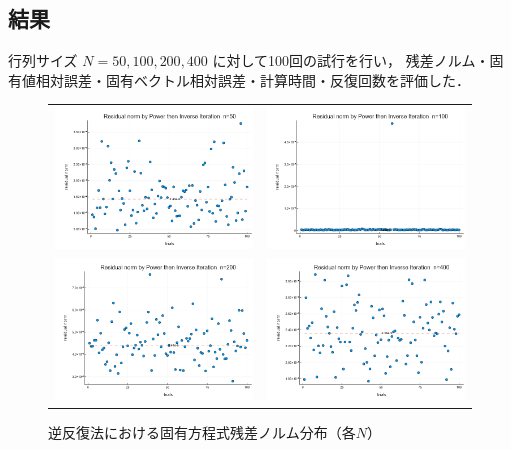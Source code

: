 \documentclass[a4paper,11pt]{ltjsarticle}
\begin{document}
\subsection{結果}
行列サイズ $N=50, 100, 200, 400$ に対して100回の試行を行い，
残差ノルム・固有値相対誤差・固有ベクトル相対誤差・計算時間・反復回数を評価した．

\begin{figure}[H]
  \centering
  \begin{tabular}{cc}
    \includegraphics[width=72mm]{graphs/exp4_n50_residual.png} &
    \includegraphics[width=72mm]{graphs/exp4_n100_residual.png} \\
    \includegraphics[width=72mm]{graphs/exp4_n200_residual.png} &
    \includegraphics[width=72mm]{graphs/exp4_n400_residual.png} \\
  \end{tabular}
  \caption{逆反復法における固有方程式残差ノルム分布（各$N$）}
  \label{fig:exp4_residual}
\end{figure}
\end{document}
